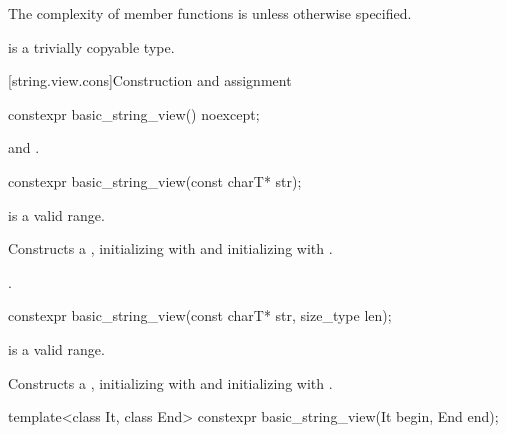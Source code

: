 \pnum
The complexity of  member functions is 
unless otherwise specified.

\pnum
{} is a trivially copyable type.

[string.view.cons]{Construction and assignment}

%
\begin{itemdecl}
constexpr basic_string_view() noexcept;
\end{itemdecl}

\begin{itemdescr}
\pnum
\ensures
{} and .
\end{itemdescr}

%
\begin{itemdecl}
constexpr basic_string_view(const charT* str);
\end{itemdecl}

\begin{itemdescr}
\pnum
\expects
{} is a valid range.

\pnum
\effects
Constructs a , initializing  with 
and initializing  with .

\pnum
\complexity
{}.
\end{itemdescr}

%
\begin{itemdecl}
constexpr basic_string_view(const charT* str, size_type len);
\end{itemdecl}

\begin{itemdescr}
\pnum
\expects
{} is a valid range.

\pnum
\effects
Constructs a , initializing  with 
and initializing  with .
\end{itemdescr}

%
\begin{itemdecl}
template<class It, class End>
  constexpr basic_string_view(It begin, End end);
\end{itemdecl}

